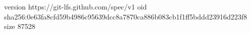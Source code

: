 version https://git-lfs.github.com/spec/v1
oid sha256:0e63fa8cfd59b4986c95639dcc8a7870ca886b083cb1f1ff5bddd23916d223f8
size 87528
